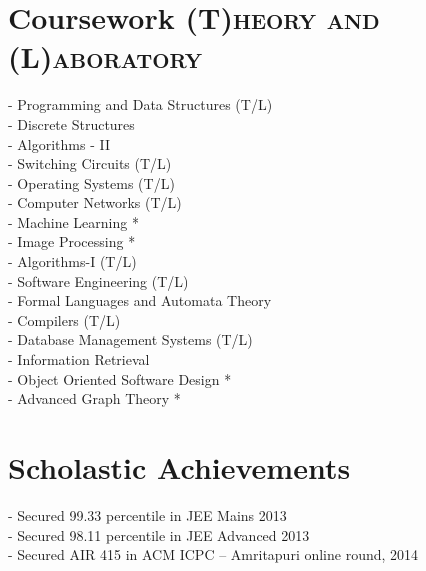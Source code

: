 \documentclass[a4paper,10pt]{extarticle} %
\begin{document}
\section{Coursework
\hfill\small\textsc{(T)heory and (L)aboratory}}

\begin{multicols}{2}
- Programming and Data Structures (T/L) \\
- Discrete Structures \\
- Algorithms - II \\
- Switching Circuits (T/L) \\
- Operating Systems (T/L) \\
- Computer Networks (T/L) \\
- Machine Learning * \\
- Image Processing * \\
- Algorithms-I (T/L) \\
- Software Engineering (T/L) \\
- Formal Languages and Automata Theory \\
- Compilers (T/L) \\
- Database Management Systems (T/L) \\
- Information Retrieval \\
- Object Oriented Software Design * \\
- Advanced Graph Theory *
\end{multicols}


\section{Scholastic Achievements}

- Secured 99.33 percentile in JEE Mains 2013 \\
- Secured 98.11 percentile in JEE Advanced 2013 \\
- Secured AIR 415 in ACM ICPC – Amritapuri online round, 2014


\end{document}
